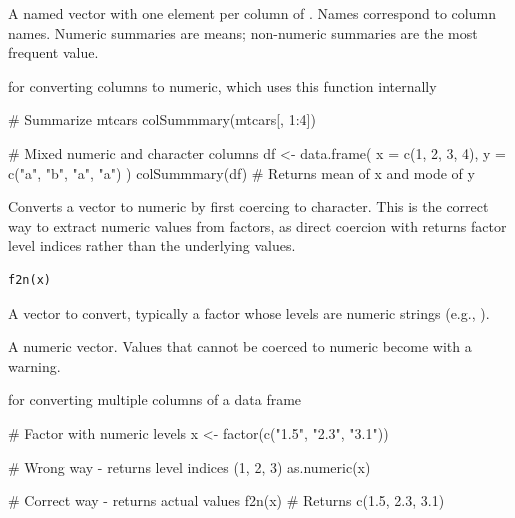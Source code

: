 \documentclass[a4paper]{book}
\begin{document}
%
\begin{Value}
A named vector with one element per column of . Names
correspond to column names. Numeric summaries are means; non-numeric
summaries are the most frequent value.
\end{Value}
%
\begin{SeeAlso}
 for converting columns to numeric,
 which uses this function internally
\end{SeeAlso}
%
\begin{Examples}
\begin{ExampleCode}
# Summarize mtcars
colSummmary(mtcars[, 1:4])

# Mixed numeric and character columns
df <- data.frame(
  x = c(1, 2, 3, 4),
  y = c("a", "b", "a", "a")
)
colSummmary(df)  # Returns mean of x and mode of y

\end{ExampleCode}
\end{Examples}
%
\begin{Description}
Converts a vector to numeric by first coercing to character. This is the
correct way to extract numeric values from factors, as direct coercion with
 returns factor level indices rather than the underlying
values.
\end{Description}
%
\begin{Usage}
\begin{verbatim}
f2n(x)
\end{verbatim}
\end{Usage}
%
\begin{Arguments}
\begin{ldescription}
\item[\code{x}] A vector to convert, typically a factor whose levels are numeric
strings (e.g., ).
\end{ldescription}
\end{Arguments}
%
\begin{Value}
A numeric vector. Values that cannot be coerced to numeric become
 with a warning.
\end{Value}
%
\begin{SeeAlso}
 for converting multiple columns of a
data frame
\end{SeeAlso}
%
\begin{Examples}
\begin{ExampleCode}
# Factor with numeric levels
x <- factor(c("1.5", "2.3", "3.1"))

# Wrong way - returns level indices (1, 2, 3)
as.numeric(x)

# Correct way - returns actual values
f2n(x)  # Returns c(1.5, 2.3, 3.1)

\end{ExampleCode}
\end{Examples}
\end{document}
